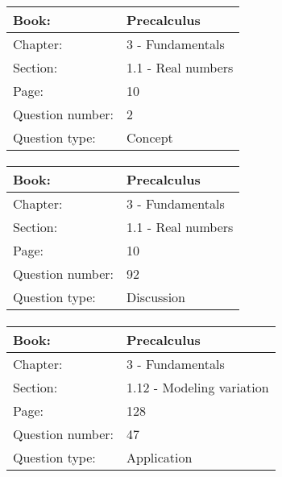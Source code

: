\documentclass{article}
\begin{document}
   \paragraph{}
   \begin{tabularx}{1\textwidth}{
           p{}
           p{}
       }
       \toprule
       Book: & Precalculus
       \\
       \midrule
       Chapter: & 3 - Fundamentals
       \\
       \midrule
       Section: & 1.1 - Real numbers
       \\
       \midrule
       Page: & 10
       \\
       \midrule
       Question number: & 2
       \\
       \midrule
       Question type: & Concept
       \\
       \bottomrule
   \end{tabularx}



   \paragraph{}
   \begin{tabularx}{1\textwidth}{
           p{}
           p{}
       }
       \toprule
       Book: & Precalculus
       \\
       \midrule
       Chapter: & 3 - Fundamentals
       \\
       \midrule
       Section: & 1.1 - Real numbers
       \\
       \midrule
       Page: & 10
       \\
       \midrule
       Question number: & 92
       \\
       \midrule
       Question type: & Discussion
       \\
       \bottomrule
   \end{tabularx}



   \paragraph{}
   \begin{tabularx}{1\textwidth}{
           p{}
           p{}
       }
       \toprule
       Book: & Precalculus
       \\
       \midrule
       Chapter: & 3 - Fundamentals
       \\
       \midrule
       Section: & 1.12 - Modeling variation
       \\
       \midrule
       Page: & 128
       \\
       \midrule
       Question number: & 47
       \\
       \midrule
       Question type: & Application
       \\
       \bottomrule
   \end{tabularx}
\end{document}

